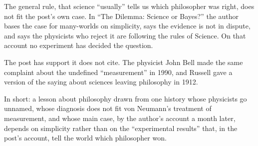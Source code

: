\begin{afterword}
The general rule, that science ``usually'' tells us which philosopher was right, does not fit the post's own case. In ``The Dilemma: Science or Bayes?'' the author bases the case for many-worlds on simplicity, says the evidence is not in dispute, and says the physicists who reject it are following the rules of Science. On that account no experiment has decided the question.

The post has support it does not cite. The physicist John Bell made the same complaint about the undefined ``measurement'' in 1990, and Russell gave a version of the saying about sciences leaving philosophy in 1912.

In short: a lesson about philosophy drawn from one history whose physicists go unnamed, whose diagnosis does not fit von Neumann's treatment of measurement, and whose main case, by the author's account a month later, depends on simplicity rather than on the ``experimental results'' that, in the post's account, tell the world which philosopher won.
\end{afterword}
